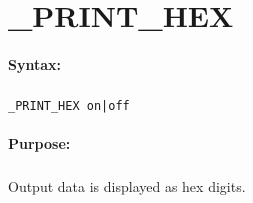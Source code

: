 
\newpage
\section{\_PRINT\_HEX}
\label{cmd:_PRINT_HEX}

\paragraph{Syntax:}
\subparagraph{}
\texttt{\_PRINT\_HEX on|off}

\paragraph{Purpose:}
\subparagraph{}
Output data is displayed as hex digits.
